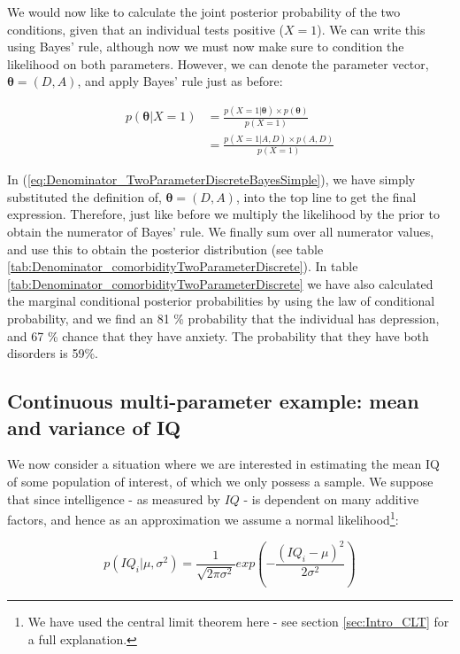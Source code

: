 \documentclass[11pt,fullpage]{book}
\begin{document}
We would now like to calculate the joint posterior probability of the two conditions, given that an individual tests positive ($X=1$). We can write this using Bayes' rule, although now we must now make sure to condition the likelihood on both parameters. However, we can denote the parameter vector, $\boldsymbol{\theta}=(D,A)$, and apply Bayes' rule just as before:

\begin{equation}\label{eq:Denominator_TwoParameterDiscreteBayesSimple}
\begin{align}
p(\boldsymbol{\theta}|X=1) &= \frac{p(X=1|\boldsymbol{\theta})\times p(\boldsymbol{\theta})}{p(X=1)}\\
& = \frac{p(X=1|A,D)\times p(A,D)}{p(X=1)}
\end{align}
\end{equation}

In (\ref{eq:Denominator_TwoParameterDiscreteBayesSimple}), we have simply substituted the definition of, $\boldsymbol{\theta}=(D,A)$, into the top line to get the final expression. Therefore, just like before we multiply the likelihood by the prior to obtain the numerator of Bayes' rule. We finally sum over all numerator values, and use this to obtain the posterior distribution (see table \ref{tab:Denominator_comorbidityTwoParameterDiscrete}). In table \ref{tab:Denominator_comorbidityTwoParameterDiscrete} we have also calculated the marginal conditional posterior probabilities by using the law of conditional probability, and we find an 81 \% probability that the individual has depression, and 67 \% chance that they have anxiety. The probability that they have both disorders is 59\%.

\subsection{Continuous multi-parameter example: mean and variance of IQ}
We now consider a situation where we are interested in estimating the mean IQ of some population of interest, of which we only possess a sample. We suppose that since intelligence - as measured by $IQ$ - is dependent on many additive factors, and hence as an approximation we assume a normal likelihood\footnote{We have used the central limit theorem here - see section \ref{sec:Intro_CLT} for a full explanation.}:

\begin{equation}
p(IQ_i|\mu,\sigma^2) = \frac{1}{\sqrt{2\pi\sigma^2}} exp\left(-\frac{(IQ_i-\mu)^2}{2\sigma^2}\right)
\end{equation}
\end{document}
